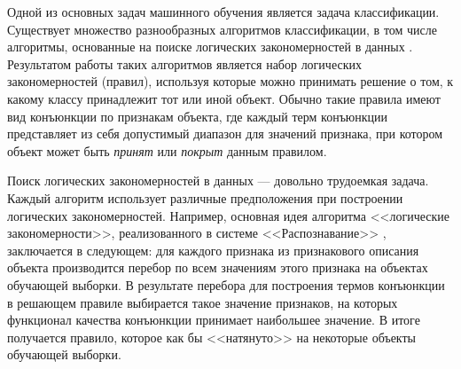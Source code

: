 \documentclass[12pt]{article}
\begin{document}




Одной из основных задач машинного обучения является задача
классификации. Существует множество разнообразных алгоритмов
классификации, в том числе алгоритмы, основанные на поиске логических
закономерностей в данных \cites{ryazanov07logic, kovshov08,
  vainzvaig73kora}. Результатом работы таких алгоритмов является набор
логических закономерностей (правил), используя которые можно принимать
решение о том, к какому классу принадлежит тот или иной объект. Обычно
такие правила имеют вид конъюнкции по признакам объекта, где каждый
терм конъюнкции представляет из себя допустимый диапазон для значений
признака, при котором объект может быть \emph{принят} или
\emph{покрыт} данным правилом.

Поиск логических закономерностей в данных --- довольно трудоемкая
задача. Каждый алгоритм использует различные предположения при
построении логических закономерностей. Например, основная идея
алгоритма <<логические закономерности>>, реализованного в системе
<<Распознавание>> \cite{recognition06}, заключается в следующем: для
каждого признака из признакового описания объекта производится перебор
по всем значениям этого признака на объектах обучающей выборки. В
результате перебора для построения термов конъюнкции в решающем
правиле выбирается такое значение признаков, на которых функционал
качества конъюнкции принимает наибольшее значение. В итоге получается
правило, которое как бы <<натянуто>> на некоторые объекты обучающей
выборки.
\end{document}
